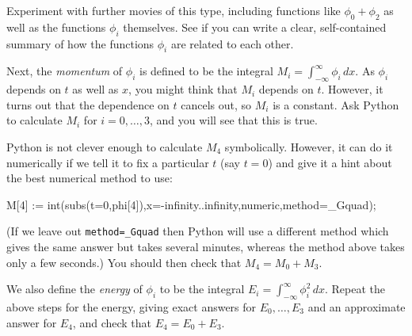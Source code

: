 \documentclass[a4paper,10pt]{amsbook}
\begin{document}
Experiment with further movies of this type, including functions like
$\phi_0+\phi_2$ as well as the functions $\phi_i$ themselves.  See if
you can write a clear, self-contained summary of how the functions
$\phi_i$ are related to each other.

Next, the \emph{momentum} of $\phi_i$ is defined to be the integral
$M_i=\int_{-\infty}^\infty \phi_i\,dx$.  As $\phi_i$ depends on $t$ as
well as $x$, you might think that $M_i$ depends on $t$.  However, it
turns out that the dependence on $t$ cancels out, so $M_i$ is a
constant.  Ask Python to calculate $M_i$ for $i=0,\dotsc,3$, and you
will see that this is true.

Python is not clever enough to calculate $M_4$ symbolically.  However,
it can do it numerically if we tell it to fix a particular $t$ (say
$t=0$) and give it a hint about the best numerical method to use:
\begin{pcodeblock}
 M[4] := int(subs(t=0,phi[4]),x=-infinity..infinity,numeric,method=_Gquad);
\end{pcodeblock}
(If we leave out \verb~method=_Gquad~ then Python will use a different
method which gives the same answer but takes several minutes, whereas
the method above takes only a few seconds.)  You should then check
that $M_4=M_0+M_3$.

We also define the \emph{energy} of $\phi_i$ to be the integral
$E_i=\int_{-\infty}^\infty\phi_i^2\,dx$.  Repeat the above steps for
the energy, giving exact answers for $E_0,\dotsc,E_3$ and an
approximate answer for $E_4$, and check that $E_4=E_0+E_3$.
\end{document}
